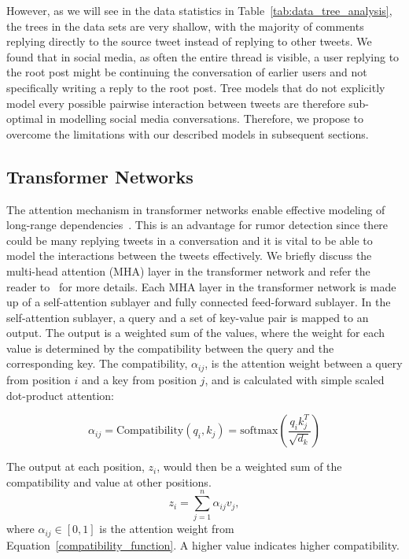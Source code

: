 \documentclass[letterpaper]{article} %
\begin{document}
However, as we will see in the data statistics in Table~\ref{tab:data_tree_analysis}, the trees in the data sets are very shallow, with the majority of comments replying directly to the source tweet instead of replying to other tweets. We found that in social media, as often the entire thread is visible, a user replying to the root post might be continuing the conversation of earlier users and not specifically writing a reply to the root post. Tree models that do not explicitly model every possible pairwise interaction between tweets are therefore sub-optimal in modelling social media conversations. Therefore, we propose to overcome the limitations with our described models in subsequent sections. 

\subsection{Transformer Networks}
The attention mechanism in transformer networks enable effective modeling of long-range dependencies~\cite{DBLP:journals/corr/VaswaniSPUJGKP17}.
This is an advantage for rumor detection since there could be many replying tweets in a conversation and it is vital to be able to model the interactions between the tweets effectively. We briefly discuss the multi-head attention (MHA) layer in the transformer network and refer the reader to~\cite{DBLP:journals/corr/VaswaniSPUJGKP17} for more details. 
Each MHA layer in the transformer network is made up of a self-attention sublayer and fully connected feed-forward sublayer.
In the self-attention sublayer, a query and a set of key-value pair is mapped to an output. The output is a weighted sum of the values, where the weight for each value is determined by the compatibility between the query and the corresponding key. The compatibility, $\alpha_{ij}$, is the attention weight between a query from position $i$ and a key from position $j$, and is calculated with simple scaled dot-product attention: 

\begin{equation}
\alpha_{ij} = \mathrm{Compatibility}(q_{i}, k_{j}) = \mathrm{softmax}(\frac{q_{i}k_{j}^T}{\sqrt{d_{k}}}) \label{compatibility_function}
\end{equation}

The output at each position, $z_i$, would then be a weighted sum of the compatibility and value at other positions. 
\begin{equation}
z_i = \sum_{j=1}^{n} \alpha_{ij} v_j, \label{weighted_sum}
\end{equation}
where $\alpha_{ij} \in [0,1]$ is the attention weight from Equation~\ref{compatibility_function}. A higher value indicates higher compatibility. 
\end{document}
